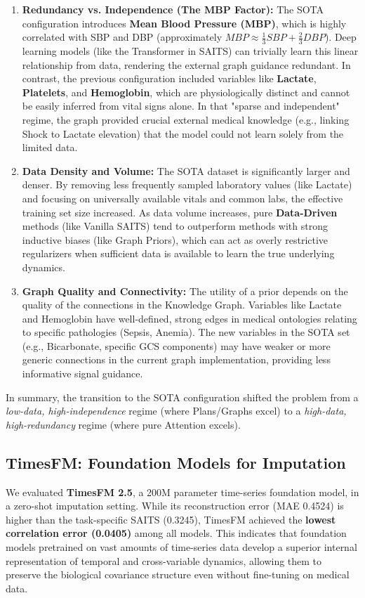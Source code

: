 \begin{enumerate}
    \item \textbf{Redundancy vs. Independence (The MBP Factor):}
    The SOTA configuration introduces \textbf{Mean Blood Pressure (MBP)}, which is highly correlated with SBP and DBP (approximately $MBP \approx \frac{1}{3}SBP + \frac{2}{3}DBP$). Deep learning models (like the Transformer in SAITS) can trivially learn this linear relationship from data, rendering the external graph guidance redundant. In contrast, the previous configuration included variables like \textbf{Lactate}, \textbf{Platelets}, and \textbf{Hemoglobin}, which are physiologically distinct and cannot be easily inferred from vital signs alone. In that "sparse and independent" regime, the graph provided crucial external medical knowledge (e.g., linking Shock to Lactate elevation) that the model could not learn solely from the limited data.

    \item \textbf{Data Density and Volume:}
    The SOTA dataset is significantly larger and denser. By removing less frequently sampled laboratory values (like Lactate) and focusing on universally available vitals and common labs, the effective training set size increased. As data volume increases, pure \textbf{Data-Driven} methods (like Vanilla SAITS) tend to outperform methods with strong inductive biases (like Graph Priors), which can act as overly restrictive regularizers when sufficient data is available to learn the true underlying dynamics.

    \item \textbf{Graph Quality and Connectivity:}
    The utility of a prior depends on the quality of the connections in the Knowledge Graph. Variables like Lactate and Hemoglobin have well-defined, strong edges in medical ontologies relating to specific pathologies (Sepsis, Anemia). The new variables in the SOTA set (e.g., Bicarbonate, specific GCS components) may have weaker or more generic connections in the current graph implementation, providing less informative signal guidance.
\end{enumerate}

In summary, the transition to the SOTA configuration shifted the problem from a \textit{low-data, high-independence} regime (where Plans/Graphs excel) to a \textit{high-data, high-redundancy} regime (where pure Attention excels).

\subsection{TimesFM: Foundation Models for Imputation}
We evaluated \textbf{TimesFM 2.5}, a 200M parameter time-series foundation model, in a zero-shot imputation setting. While its reconstruction error (MAE 0.4524) is higher than the task-specific SAITS (0.3245), TimesFM achieved the \textbf{lowest correlation error (0.0405)} among all models. This indicates that foundation models pretrained on vast amounts of time-series data develop a superior internal representation of temporal and cross-variable dynamics, allowing them to preserve the biological covariance structure even without fine-tuning on medical data.

